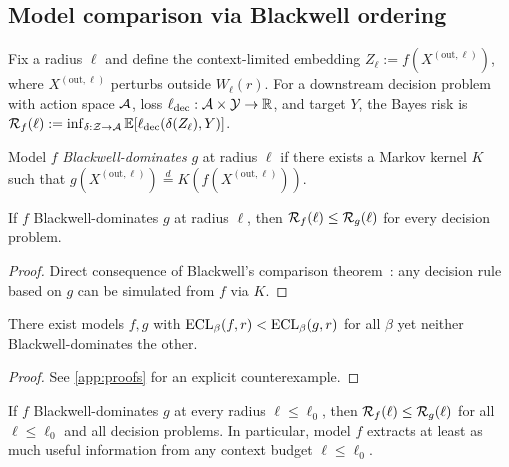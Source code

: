 \subsection{Model comparison via Blackwell ordering}\label{sec:blackwell}

Fix a radius $\ell$ and define the context-limited embedding $Z_\ell := f(X^{(\mathrm{out},\ell)})$, where $X^{(\mathrm{out},\ell)}$ perturbs outside $W_\ell(r)$. For a downstream decision problem with action space $\mathcal{A}$, loss $\ell_{\mathrm{dec}}:\mathcal{A}\times \mathcal{Y}\to\mathbb{R}$, and target $Y$, the Bayes risk is
$\mathcal{R}_f(\ell) := \inf_{\delta:\mathcal{Z}\to \mathcal{A}} \mathbb{E}[\ell_{\mathrm{dec}}(\delta(Z_\ell),Y)]$.

\begin{definition}\label{def:blackwell}
Model $f$ \emph{Blackwell-dominates} $g$ at radius $\ell$ if there exists a Markov kernel $K$ such that $g(X^{(\mathrm{out},\ell)}) \stackrel{d}{=} K(f(X^{(\mathrm{out},\ell)}))$.
\end{definition}

\begin{theorem}\label{thm:blackwell}
If $f$ Blackwell-dominates $g$ at radius $\ell$, then $\mathcal{R}_f(\ell) \le \mathcal{R}_g(\ell)$ for every decision problem.
\end{theorem}
\begin{proof}
Direct consequence of Blackwell's comparison theorem~\citep{Blackwell1951Comparison}: any decision rule based on $g$ can be simulated from $f$ via $K$.
\end{proof}

\begin{proposition}\label{prop:ecl_not_blackwell}
There exist models $f,g$ with $\mathrm{ECL}_\beta(f,r) < \mathrm{ECL}_\beta(g,r)$ for all $\beta$ yet neither Blackwell-dominates the other.
\end{proposition}
\begin{proof}
See \cref{app:proofs} for an explicit counterexample.
\end{proof}

\begin{proposition}\label{prop:risk_ordering}
If $f$ Blackwell-dominates $g$ at every radius $\ell \le \ell_0$, then $\mathcal{R}_f(\ell) \le \mathcal{R}_g(\ell)$ for all $\ell \le \ell_0$ and all decision problems. In particular, model $f$ extracts at least as much useful information from any context budget $\ell \le \ell_0$.
\end{proposition}

